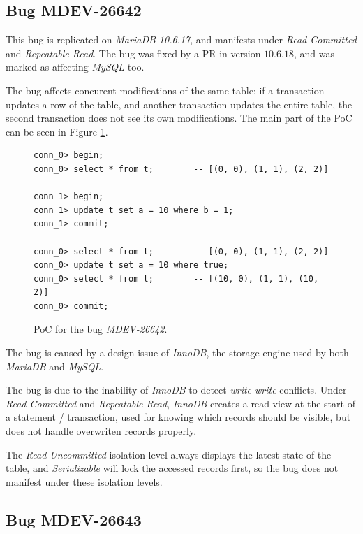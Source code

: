 \subsection*{Bug MDEV-26642}


This bug is replicated on \textit{MariaDB 10.6.17}, and manifests under \textit{Read Committed} and \textit{Repeatable Read}. The bug was fixed by a PR in version \textit{$10.6.18$}, and was marked as affecting \textit{MySQL} too.


The bug affects concurent modifications of the same table: if a transaction updates a row of the table, and another transaction updates the entire table, the second transaction does not see its own modifications. The main part of the PoC can be seen in Figure \ref{fig:MDEV-26642}.


\begin{figure}
\begin{verbatim}
conn_0> begin;
conn_0> select * from t;        -- [(0, 0), (1, 1), (2, 2)]

conn_1> begin;
conn_1> update t set a = 10 where b = 1;
conn_1> commit;

conn_0> select * from t;        -- [(0, 0), (1, 1), (2, 2)]
conn_0> update t set a = 10 where true;
conn_0> select * from t;        -- [(10, 0), (1, 1), (10, 2)]
conn_0> commit;
\end{verbatim}
\caption{PoC for the bug \textit{MDEV-26642}.} \label{fig:MDEV-26642}
\end{figure}

The bug is caused by a design issue of \textit{InnoDB}, the storage engine used by both \textit{MariaDB} and \textit{MySQL}.

The bug is due to the inability of \textit{InnoDB} to detect \textit{write-write} conflicts. Under \textit{Read Committed} and \textit{Repeatable Read}, \textit{InnoDB} creates a read view at the start of a statement / transaction, used for knowing which records should be visible, but does not handle overwriten records properly. 

The \textit{Read Uncommitted} isolation level always displays the latest state of the table, and \textit{Serializable} will lock the accessed records first, so the bug does not manifest under these isolation levels.

\subsection*{Bug MDEV-26643}


